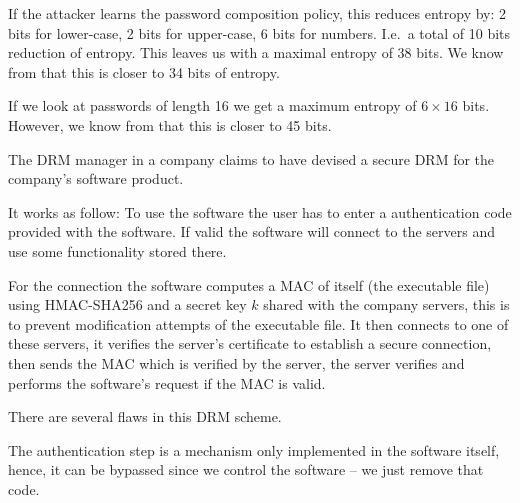 \documentclass[svv,addpoints]{miunexam}
\begin{document}
\begin{questions}
\begin{solution}
    If the attacker learns the password composition policy, this reduces 
    entropy by:
    2 bits for lower-case,
    2 bits for upper-case,
    6 bits for numbers.
    I.e.\ a total of 10 bits reduction of entropy.
    This leaves us with a maximal entropy of 38 bits.
    We know from \cite{Komanduri2011opa} that this is closer to 34 bits of 
    entropy.

    If we look at passwords of length 16 we get a maximum entropy of \(6\times 
    16\) bits.
    However, we know from \cite{Komanduri2011opa} that this is closer to 45 
    bits.
  \end{solution}


  \question\label{q:drm}
  The DRM manager in a company claims to have devised a secure DRM for the 
  company's software product.

  It works as follow:
  To use the software the user has to enter a authentication code provided with 
  the software.
  If valid the software will connect to the servers and use some functionality 
  stored there.

  For the connection the software computes a MAC of itself (the executable 
  file) using HMAC-SHA256 and a secret key \(k\) shared with the company 
  servers, this is to prevent modification attempts of the executable file.
  It then connects to one of these servers, it verifies the server's 
  certificate to establish a secure connection, then sends the MAC which is 
  verified by the server, the server verifies and performs the software's 
  request if the MAC is valid.

  There are several flaws in this DRM scheme.
  \begin{solution}
    The authentication step is a mechanism only implemented in the software 
    itself, hence, it can be bypassed since we control the software -- we just 
    remove that code.


\end{solution}
\end{questions}
\end{document}
